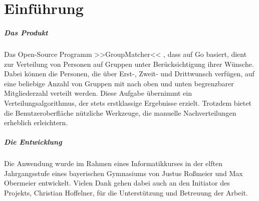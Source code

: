 \chapter{Einführung}
\label{ch:einführung}

\paragraph{Das Produkt} Das Open-Source Programm >>GroupMatcher<< , dass auf Go  basiert, dient zur Verteilung von Personen auf Gruppen unter Berücksichtigung ihrer Wünsche. Dabei können die Personen, die über Erst-, Zweit- und Drittwunsch verfügen, auf eine beliebige Anzahl von Gruppen mit nach oben und unten begrenzbarer Mitgliederzahl verteilt werden. Diese Aufgabe übernimmt ein Verteilungsalgorithmus, der stets erstklassige Ergebnisse erzielt. Trotzdem bietet die Benutzeroberfläche nützliche Werkzeuge, die manuelle Nachverteilungen erheblich erleichtern.
\paragraph{Die Entwicklung} Die Anwendung wurde im Rahmen eines Informatikkurses in der elften Jahrgangsstufe eines bayerischen Gymnasiums von Justus Roßmeier und Max Obermeier entwickelt. Vielen Dank gehen dabei auch an den Initiator des Projekts, Christian Hoffelner, für die Unterstützung und Betreuung der Arbeit.
